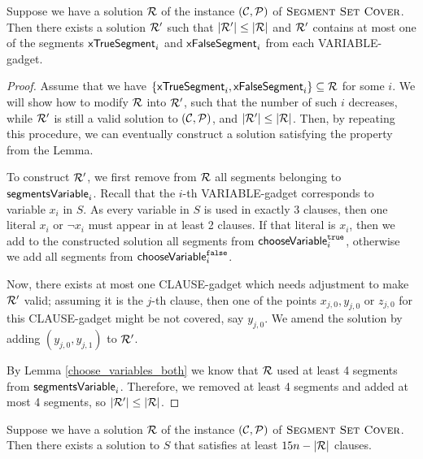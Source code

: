 \begin{lemma}
	\label{at_most_one_var_segment}
	Suppose we have a solution $\mathcal{R}$ of the instance $(\mathcal{C}, \mathcal{P})$
	of $\textsc{Segment Set Cover}$.
	Then there exists a solution $\mathcal{R}'$ such that $|\mathcal{R}'| \le |\mathcal{R}|$
	and $\mathcal{R}'$ contains
	at most one of the segments $\mathsf{xTrueSegment}_{i}$ and $\mathsf{xFalseSegment}_{i}$
	from each VARIABLE-gadget.
\end{lemma}
\begin{proof}\leavevmode
Assume that we have $\{\mathsf{xTrueSegment}_{i}, \mathsf{xFalseSegment}_{i}\} \subseteq \mathcal{R}$ for some $i$.
We will show how to modify $\mathcal{R}$ into $\mathcal{R}'$,
such that the number of such $i$ decreases,
while $\mathcal{R}'$ is still a valid solution to $(\mathcal{C}, \mathcal{P})$,
and $|\mathcal{R}'| \le |\mathcal{R}|$. Then, by repeating this procedure,
we can eventually construct a solution satisfying the property from the Lemma.

To construct $\mathcal{R}'$, 
we first remove from $\mathcal{R}$ all segments belonging to $\mathsf{segmentsVariable}_{i}$.
Recall that the $i$-th VARIABLE-gadget corresponds to variable $x_i$ in $S$.
As every variable in $S$ is used in exactly 3 clauses,
then one literal $x_i$ or $\neg x_i$ must appear in at least
2 clauses.
If that literal is $x_i$, then we add to the constructed solution all segments from $\mathsf{chooseVariable}^{\texttt{true}}_{i}$,
otherwise we add all segments from $\mathsf{chooseVariable}^{\texttt{false}}_{i}$.

Now, there exists at most one CLAUSE-gadget which needs adjustment to make $\mathcal{R}'$ valid;
assuming it is the $j$-th clause, then one of the points $x_{j,0}, y_{j,0}$ or $z_{j,0}$ for this
CLAUSE-gadget might be not covered, say $y_{j,0}$.
We amend the solution by adding $(y_{j,0}, y_{j,1})$ to $\mathcal{R}'$.

By Lemma \ref{choose_variables_both} we know 
that $\mathcal{R}$ used at least 4 segments from $\mathsf{segmentsVariable}_{i}$.
Therefore, we removed at least 4 segments and added at most 4 segments,
so $|\mathcal{R}'| \le |\mathcal{R}|$.
\end{proof}

\begin{lemma}
	\label{construction_completness}
	Suppose we have a solution $\mathcal{R}$ of the instance $(\mathcal{C}, \mathcal{P})$
	of $\textsc{Segment Set Cover}$.
	Then there exists a solution to $S$
	that satisfies at least $15n - |\mathcal{R}|$ clauses.
\end{lemma}


